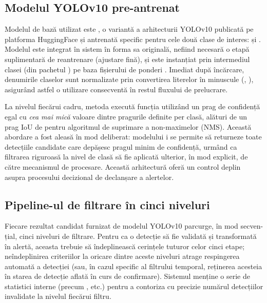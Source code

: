 \documentclass[../../main.tex]{subfiles}
\begin{document}
\subsection{Modelul YOLOv10 pre-antrenat}
\label{subsec:yolov10_preantrenat}

Modelul de bază utilizat este , o variantă a arhitecturii YOLOv10 publicată pe platforma HuggingFace și antrenată specific pentru cele două clase de interes:  și . Modelul este integrat în sistem în forma sa originală, nefiind necesară o etapă suplimentară de reantrenare (ajustare fină), și este instanțiat prin intermediul clasei  (din pachetul ) pe baza fișierului de ponderi  . Imediat după încărcare, denumirile claselor sunt normalizate prin convertirea literelor în minuscule (, ), asigurând astfel o utilizare consecventă în restul fluxului de prelucrare.

La nivelul fiecărui cadru, metoda  execută funcția \linebreak {} utilizând un prag de confidență egal cu \textit{cea mai mică} valoare dintre pragurile definite per clasă, alături de un prag IoU de  pentru algoritmul de suprimare a non-maximelor (NMS). Această abordare a fost aleasă în mod deliberat: modelului i se permite să returneze toate detecțiile candidate care depășesc pragul minim de confidență, urmând ca filtrarea riguroasă la nivel de clasă să fie aplicată ulterior, în mod explicit, de către mecanismul de procesare. Această arhitectură oferă un control deplin asupra procesului decizional de declanșare a alertelor.

\subsection{Pipeline-ul de filtrare în cinci niveluri}
\label{subsec:pipeline_filtrare}

Fiecare rezultat candidat furnizat de modelul YOLOv10 parcurge, în mod secven-țial, cinci niveluri de filtrare. Pentru ca o detecție să fie validată și transformată în alertă, aceasta trebuie să îndeplinească cerințele tuturor celor cinci etape; neîndeplinirea criteriilor la oricare dintre aceste niveluri atrage respingerea automată a detecției (sau, în cazul specific al filtrului temporal, reținerea acesteia în starea de detecție aflată în curs de confirmare). Sistemul menține o serie de statistici interne (precum ,  etc.) pentru a contoriza cu precizie numărul detecțiilor invalidate la nivelul fiecărui filtru.
\end{document}
